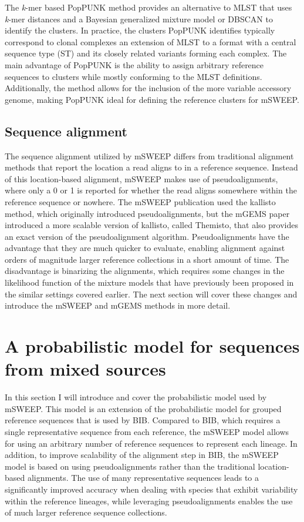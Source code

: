 \documentclass[officiallayout]{tktla}
\begin{document}
The \textit{k}-mer based PopPUNK method provides an alternative to
MLST that uses \textit{k}-mer distances and a Bayesian generalized
mixture model or DBSCAN to identify the clusters. In practice, the
clusters PopPUNK identifies typically correspond to clonal complexes
\textemdash an extension of MLST to a format with a central sequence
type (ST) and its closely related variants forming each complex. The
main advantage of PopPUNK is the ability to assign arbitrary reference
sequences to clusters while mostly conforming to the MLST
definitions. Additionally, the method allows for the inclusion of the
more variable accessory genome, making PopPUNK ideal for defining the
reference clusters for mSWEEP.

\subsection{Sequence alignment}
\label{section:sequence-alignment}

The sequence alignment utilized by mSWEEP differs from traditional
alignment methods that report the location a read aligns to in a
reference sequence. Instead of this location-based alignment, mSWEEP
makes use of pseudoalignments, where only a 0 or 1 is reported for
whether the read aligns somewhere within the reference sequence or
nowhere. The mSWEEP publication used the kallisto method, which
originally introduced pseudoalignments, but the mGEMS paper introduced
a more scalable version of kallisto, called Themisto, that also
provides an exact version of the pseudoalignment
algorithm. Pseudoalignments have the advantage that they are much
quicker to evaluate, enabling alignment against orders of magnitude
larger reference collections in a short amount of time. The
disadvantage is binarizing the alignments, which requires some changes
in the likelihood function of the mixture models that have previously
been proposed in the similar settings covered earlier. The next
section will cover these changes and introduce the mSWEEP and mGEMS
methods in more detail.

\section{A probabilistic model for sequences from mixed sources}
\label{section:model}

In this section I will introduce and cover the probabilistic model
used by mSWEEP. This model is an extension of the probabilistic model
for grouped reference sequences that is used by BIB. Compared to BIB,
which requires a single representative sequence from each reference,
the mSWEEP model allows for using an arbitrary number of reference
sequences to represent each lineage. In addition, to improve
scalability of the alignment step in BIB, the mSWEEP model is based on
using pseudoalignments rather than the traditional location-based
alignments. The use of many representative sequences leads to a
significantly improved accuracy when dealing with species that exhibit
variability within the reference lineages, while leveraging
pseudoalignments enables the use of much larger reference sequence
collections.
\end{document}
